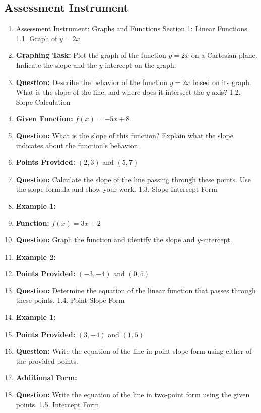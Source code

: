 \subsection{Assessment Instrument}

\begin{enumerate}
    \item Assessment Instrument: Graphs and Functions Section 1: Linear Functions 1.1. Graph of $y = 2x$
    \item \textbf{Graphing Task:} Plot the graph of the function $y = 2x$ on a Cartesian plane. Indicate the slope and the $y$-intercept on the graph.
    \item \textbf{Question:} Describe the behavior of the function $y = 2x$ based on its graph. What is the slope of the line, and where does it intersect the $y$-axis? 1.2. Slope Calculation
    \item \textbf{Given Function:} $f(x) = -5x + 8$
    \item \textbf{Question:} What is the slope of this function? Explain what the slope indicates about the function's behavior.
    \item \textbf{Points Provided:} $(2, 3)$ and $(5, 7)$
    \item \textbf{Question:} Calculate the slope of the line passing through these points. Use the slope formula and show your work. 1.3. Slope-Intercept Form
    \item \textbf{Example 1:}
    \item \textbf{Function:} $f(x) = 3x + 2$
    \item \textbf{Question:} Graph the function and identify the slope and $y$-intercept.
    \item \textbf{Example 2:}
    \item \textbf{Points Provided:} $(-3, -4)$ and $(0, 5)$
    \item \textbf{Question:} Determine the equation of the linear function that passes through these points. 1.4. Point-Slope Form
    \item \textbf{Example 1:}
    \item \textbf{Points Provided:} $(3, -4)$ and $(1, 5)$
    \item \textbf{Question:} Write the equation of the line in point-slope form using either of the provided points.
    \item \textbf{Additional Form:}
    \item \textbf{Question:} Write the equation of the line in two-point form using the given points. 1.5. Intercept Form

\end{enumerate}
